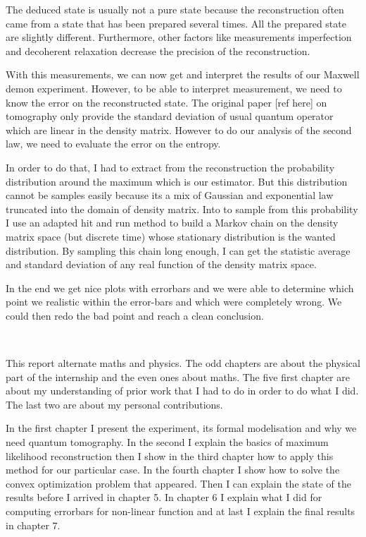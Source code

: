 \documentclass[10pt]{report}
\theoremstyle{plain}
\theoremstyle{definition}
\theoremstyle{remark}
\begin{document}
The deduced state is usually not a pure state because the reconstruction often
came from a state that has been prepared several times.
All the prepared state are slightly different.
Furthermore, other factors like measurements imperfection and decoherent
relaxation decrease the precision of the reconstruction.

With this measurements, we can now get and interpret the results of our Maxwell
demon experiment. However, to be able to interpret measurement, we need to know
the error on the reconstructed state. The original paper [ref here] on
tomography only provide the standard deviation of usual quantum operator which
are linear in the density matrix. However to do our analysis of the second law,
we need to evaluate the error on the entropy.

In order to do that, I had to extract from the reconstruction the probability
distribution around the maximum which is our estimator. But this distribution
cannot be samples easily because its a mix of Gaussian and exponential law
truncated into the domain of density matrix. Into to sample from this
probability I use an adapted hit and run method to build a Markov chain on the
density matrix space (but discrete time) whose stationary distribution is the
wanted distribution. By sampling this chain long enough, I can get the statistic
average and standard deviation of any real function of the density matrix space.

In the end we get nice plots with errorbars and we were able to determine which
point we realistic within the error-bars and which were completely wrong. We
could then redo the bad point and reach a clean conclusion.

\

This report alternate maths and physics. The odd chapters are about the physical
part of the internship and the even ones about maths. The five first chapter are
about my understanding of prior work that I had to do in order to do what I did.
The last two are about my personal contributions.

In the first chapter I
present the experiment, its formal modelisation and why we need quantum tomography. In the
second I explain the basics of maximum likelihood reconstruction then I show in
the third chapter how to apply this method for our particular case. In the
fourth chapter I show how to solve the convex optimization problem that appeared. Then I can
explain the state of the results before I arrived in chapter 5. In chapter 6 I
explain what I did for computing errorbars for non-linear function and at last
I explain the final results in chapter 7.
\end{document}
